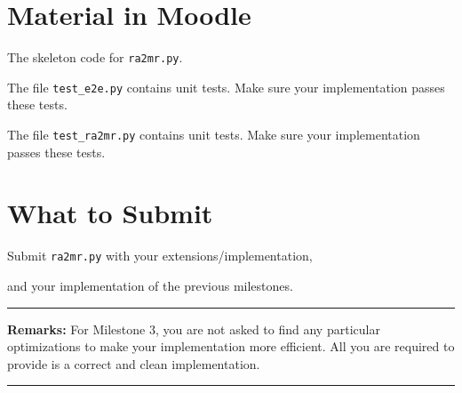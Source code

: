 \documentclass[12pt]{exam}
\begin{document}
\section{Material in Moodle}
\begin{compactitem}
\item
The skeleton code for \verb!ra2mr.py!.

\item
The file \verb!test_e2e.py! contains unit tests. Make sure your implementation passes these tests.

\item
The file \verb!test_ra2mr.py! contains unit tests. Make sure your implementation passes these tests.

\end{compactitem}

\section{What to Submit}
\begin{compactitem}
\item
Submit \verb!ra2mr.py! with your extensions/implementation,

\item
and your implementation of the previous milestones. 
\end{compactitem}

\bigskip
\noindent
\rule{\linewidth}{0.5mm}

{\bf Remarks:}
For Milestone 3, you are not asked to find any particular optimizations to make your implementation more efficient. All you are required to provide is a correct and clean implementation.

\noindent
\rule{\linewidth}{0.5mm}
\end{document}
